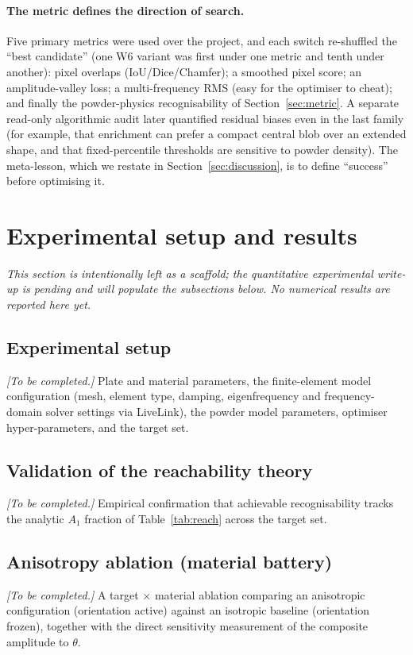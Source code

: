 \documentclass[11pt,a4paper]{article}
\newcommand{\Aone}{A_1}
\begin{document}
\paragraph{The metric defines the direction of search.}
Five primary metrics were used over the project, and each switch re-shuffled the
``best candidate'' (one W6 variant was first under one metric and tenth under
another): pixel overlaps (IoU/Dice/Chamfer); a smoothed pixel score; an
amplitude-valley loss; a multi-frequency RMS (easy for the optimiser to cheat);
and finally the powder-physics recognisability of Section~\ref{sec:metric}. A
separate read-only algorithmic audit later quantified residual biases even in the
last family (for example, that enrichment can prefer a compact central blob over an
extended shape, and that fixed-percentile thresholds are sensitive to powder
density). The meta-lesson, which we restate in Section~\ref{sec:discussion}, is to
define ``success'' before optimising it.

\section{Experimental setup and results}\label{sec:experiments}

\noindent\emph{This section is intentionally left as a scaffold; the quantitative
experimental write-up is pending and will populate the subsections below. No
numerical results are reported here yet.}

\subsection{Experimental setup}
\noindent\textit{[To be completed.]} Plate and material parameters, the
finite-element model configuration (mesh, element type, damping, eigenfrequency
and frequency-domain solver settings via LiveLink), the powder model parameters,
optimiser hyper-parameters, and the target set.

\subsection{Validation of the reachability theory}
\noindent\textit{[To be completed.]} Empirical confirmation that achievable
recognisability tracks the analytic $\Aone$ fraction of Table~\ref{tab:reach}
across the target set.

\subsection{Anisotropy ablation (material battery)}
\noindent\textit{[To be completed.]} A target $\times$ material ablation comparing
an anisotropic configuration (orientation active) against an isotropic baseline
(orientation frozen), together with the direct sensitivity measurement of the
composite amplitude to $\theta$.
\end{document}
